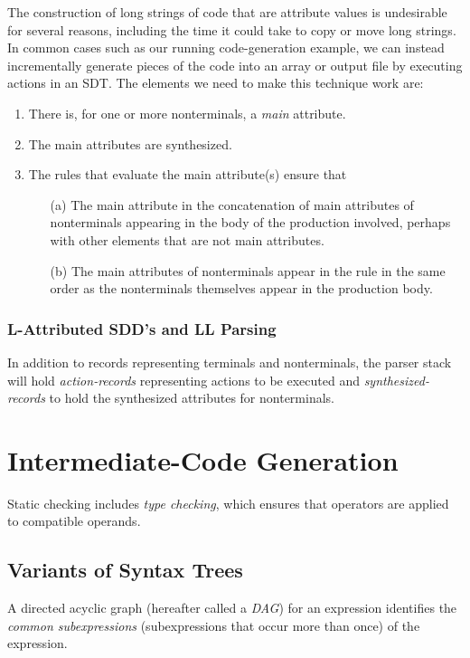 \documentclass[12pt,a4paper,twoside,openany]{book}
\begin{document}
The construction of long strings of code that are attribute values is undesirable for several reasons, including the time it could take to copy or move long strings. In common cases such as our running code-generation example, we can instead incrementally generate pieces of the code into an array or output file by executing actions in an SDT. The elements we need to make this technique work are:
\begin{enumerate}
    \item There is, for one or more nonterminals, a \textit{main} attribute.
    \item The main attributes are synthesized.
    \item The rules that evaluate the main attribute(s) ensure that
    \begin{itemize}
        \item [(a)] The main attribute in the concatenation of main attributes of nonterminals appearing in the body of the production involved, perhaps with other elements that are not main attributes.
        \item [(b)] The main attributes of nonterminals appear in the rule in the same order as the nonterminals themselves appear in the production body.
    \end{itemize}
\end{enumerate}

\subsection{L-Attributed SDD's and LL Parsing}

In addition to records representing terminals and nonterminals, the parser stack will hold \textit{action-records} representing actions to be executed and \textit{synthesized-records} to hold the synthesized attributes for nonterminals.

\chapter{Intermediate-Code Generation}

Static checking includes \textit{type checking}, which ensures that operators are applied to compatible operands.

\section{Variants of Syntax Trees}

A directed acyclic graph (hereafter called a \textit{DAG}) for an expression identifies the \textit{common subexpressions} (subexpressions that occur more than once) of the expression.
\end{document}
